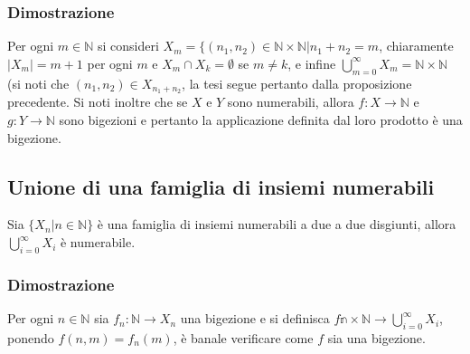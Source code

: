 \subsubsection{Dimostrazione}
Per ogni $m\in\mathbb{N}$ si consideri $X_m=\{(n_1, n_2)\in\mathbb{N}\times\mathbb{N}|n_1+n_2=m$, chiaramente $|X_m|=m+1$ per ogni $m$ e $X_m\cap X_k=\emptyset$ se $m\neq k$,
e infine $\bigcup\limits_{m=0}^\infty X_m=\mathbb{N}\times\mathbb{N}$ (si noti che $(n_1, n_2)\in X_{n_1+n_2}$, la tesi segue pertanto dalla proposizione precedente. Si noti 
inoltre che se $X$ e $Y$ sono numerabili, allora $f:X\rightarrow\mathbb{N}$ e $g:Y\rightarrow\mathbb{N}$ sono bigezioni e pertanto la applicazione definita dal loro prodotto
\`e una bigezione. 
\subsection{Unione di una famiglia di insiemi numerabili}
Sia $\{X_n|n\in\mathbb{N}\}$ \`e una famiglia di insiemi numerabili a due a due disgiunti, allora $\bigcup\limits_{i=0}^\infty X_i$ \`e numerabile.
\subsubsection{Dimostrazione}
Per ogni $n\in\mathbb{N}$ sia $f_n:\mathbb{N}\rightarrow X_n$ una bigezione e si definisca $f\mathbb{n}\times\mathbb{N}\rightarrow\bigcup\limits_{i=0}^\infty X_i$, ponendo 
$f(n,m)=f_n(m)$, \`e banale verificare come $f$ sia una bigezione. 